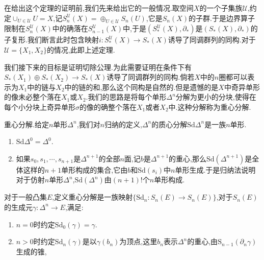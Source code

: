 在给出这个定理的证明前,我们先来给出它的一般情况.取空间$X$的一个子集族$\mathscr{U}$,约定$\cup_{U\in\mathscr{U}}U=X$,记$S_n^{\mathscr{U}}(X)=\oplus_{U\in\mathscr{U}}S_n(U)$,它是$S_n(X)$的子群.于是边界算子限制在$S_n^{\mathscr{U}}(X)$中的确落在$S_{n-1}^{\mathscr{U}}(X)$中,于是$(S_*^{\mathscr{U}}(X),\partial_*)$是$(S_*(X),\partial_*)$的子复形.我们断言此时包含映射$i:S_*^{\mathscr{U}}(X)\to S_*(X)$诱导了同调群列的同构.对于$\mathscr{U}=\{X_1,X_2\}$的情况,此即上述定理.

我们接下来的目标是证明切除公理.为此需要证明在条件下有$S_*(X_1)\oplus S_*(X_2)\to S_*(X)$诱导了同调群列的同构.倘若$X$中的$n$圈都可以表示为$X_1$中的链与$X_2$中的链的和,那么这个同构是自然的.但是遗憾的是$X$中奇异单形的像未必整个落在$X_1$或$X_2$.我们的思路是将每个单形$\Delta^n$分解为更小的分块,使得在每个小分块上奇异单形$\sigma$的像的确整个落在$X_1$或者$X_2$中.这种分解称为重心分解.

重心分解.给定$n$单形$\Delta^n$,我们对$n$归纳的定义,$\Delta^n$的质心分解$\mathrm{Sd}\Delta^n$是一族$n$单形.
\begin{enumerate}
	\item $\mathrm{Sd}\Delta^0=\Delta^0$.
	\item 如果$s_0,s_1,\cdots,s_{n+1}$是$\Delta^{n+1}$的全部$n$面,记$b$是$\Delta^{n+1}$的重心,那么$\mathrm{Sd}(\Delta^{n+1})$是全体这样的$n+1$单形构成的集合,它由$b$和$\mathrm{Sd}(s_i)$中$n$单形生成.于是归纳法说明对于仿射$n$单形$\Delta^n$,$\mathrm{Sd}(\Delta^n)$由$(n+1)!$个$n$单形构成.
\end{enumerate}

对于一般凸集$E$,定义重心分解是一族映射$\{\mathrm{Sd}_n:S_n(E)\to S_n(E)\}$,对于$S_n(E)$的生成元$\gamma:\Delta^n\to E$,满足:
\begin{enumerate}
	\item $n=0$时约定$\mathrm{Sd}_0(\gamma)=\gamma$.
	\item $n>0$时约定$\mathrm{Sd}_n(\gamma)$是以$\gamma(b_n)$为顶点,这里$b_n$表示$\Delta^n$的重心,由$\mathrm{S}_{n-1}(\partial_n\gamma)$生成的锥,
\end{enumerate}

